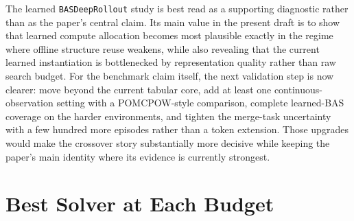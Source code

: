 \documentclass[10pt,twocolumn]{article}
\begin{document}
The learned \texttt{BASDeepRollout} study is best read as a supporting diagnostic rather than as the paper's central claim. Its main value in the present draft is to show that learned compute allocation becomes most plausible exactly in the regime where offline structure reuse weakens, while also revealing that the current learned instantiation is bottlenecked by representation quality rather than raw search budget. For the benchmark claim itself, the next validation step is now clearer: move beyond the current tabular core, add at least one continuous-observation setting with a POMCPOW-style comparison, complete learned-BAS coverage on the harder environments, and tighten the merge-task uncertainty with a few hundred more episodes rather than a token extension. Those upgrades would make the crossover story substantially more decisive while keeping the paper's main identity where its evidence is currently strongest.

\appendix
\section{Best Solver at Each Budget}
\end{document}

